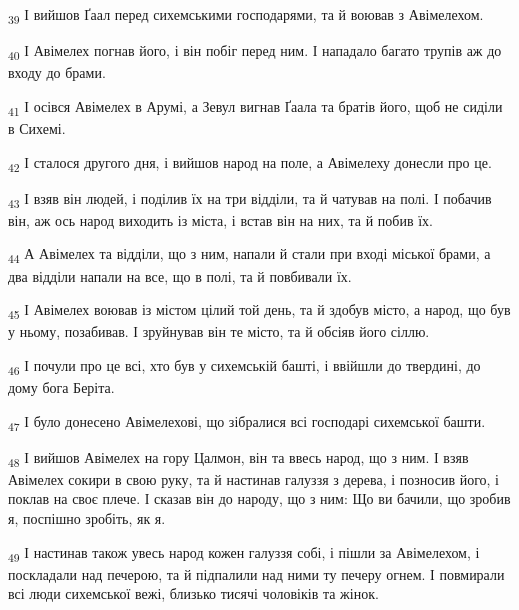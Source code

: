 \begin{tcolorbox}
\textsubscript{39} І вийшов Ґаал перед сихемськими господарями, та й воював з Авімелехом.
\end{tcolorbox}
\begin{tcolorbox}
\textsubscript{40} І Авімелех погнав його, і він побіг перед ним. І нападало багато трупів аж до входу до брами.
\end{tcolorbox}
\begin{tcolorbox}
\textsubscript{41} І осівся Авімелех в Арумі, а Зевул вигнав Ґаала та братів його, щоб не сиділи в Сихемі.
\end{tcolorbox}
\begin{tcolorbox}
\textsubscript{42} І сталося другого дня, і вийшов народ на поле, а Авімелеху донесли про це.
\end{tcolorbox}
\begin{tcolorbox}
\textsubscript{43} І взяв він людей, і поділив їх на три відділи, та й чатував на полі. І побачив він, аж ось народ виходить із міста, і встав він на них, та й побив їх.
\end{tcolorbox}
\begin{tcolorbox}
\textsubscript{44} А Авімелех та відділи, що з ним, напали й стали при вході міської брами, а два відділи напали на все, що в полі, та й повбивали їх.
\end{tcolorbox}
\begin{tcolorbox}
\textsubscript{45} І Авімелех воював із містом цілий той день, та й здобув місто, а народ, що був у ньому, позабивав. І зруйнував він те місто, та й обсіяв його сіллю.
\end{tcolorbox}
\begin{tcolorbox}
\textsubscript{46} І почули про це всі, хто був у сихемській башті, і ввійшли до твердині, до дому бога Беріта.
\end{tcolorbox}
\begin{tcolorbox}
\textsubscript{47} І було донесено Авімелехові, що зібралися всі господарі сихемської башти.
\end{tcolorbox}
\begin{tcolorbox}
\textsubscript{48} І вийшов Авімелех на гору Цалмон, він та ввесь народ, що з ним. І взяв Авімелех сокири в свою руку, та й настинав галуззя з дерева, і позносив його, і поклав на своє плече. І сказав він до народу, що з ним: Що ви бачили, що зробив я, поспішно зробіть, як я.
\end{tcolorbox}
\begin{tcolorbox}
\textsubscript{49} І настинав також увесь народ кожен галуззя собі, і пішли за Авімелехом, і поскладали над печерою, та й підпалили над ними ту печеру огнем. І повмирали всі люди сихемської вежі, близько тисячі чоловіків та жінок.
\end{tcolorbox}
